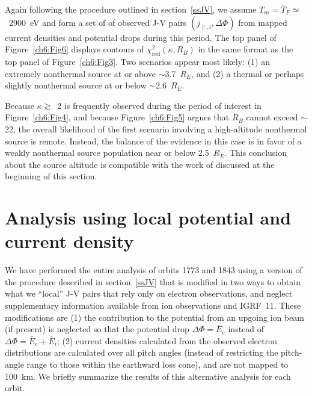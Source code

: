   
  Again following the procedure outlined in section~\ref{ssJV}, we assume
  $T_m = \bar{T}_F \simeq$~2900~eV and form a set of of observed J-V pairs
  $( j_{\parallel,i} , \Delta \Phi )$ from mapped current densities and
  potential drops during this period. The top panel of Figure~\ref{ch6:Fig6}
  displays contours of $\chi^2_{\textrm{red}} ( \kappa, R_B )$ in the same
  format as the top panel of Figure~\ref{ch6:Fig3}. Two scenarios appear most
  likely: (1) an extremely nonthermal source at or above $\sim$3.7~$R_E$, and
  (2) a thermal or perhaps slightly nonthermal source at or below
  $\sim$2.6~$R_E$.

  Because $\kappa \gtrsim$~2 is frequently observed during the period of
  interest in Figure~\ref{ch6:Fig4}, and because Figure~\ref{ch6:Fig5} argues
  that $R_B$ cannot exceed $\sim$22, the overall likelihood of the first
  scenario involving a high-altitude nonthermal source is remote. Instead, the
  balance of the evidence in this case is in favor of a weakly nonthermal source
  population near or below 2.5~$R_E$. This conclusion about the source altitude
  is compatible with the work of \citet{Ergun1998} discussed at the beginning of
  this section.
  
  \section{Analysis using local potential and current density}

  We have performed the entire analysis of orbits 1773 and 1843 using a version
  of the procedure described in section~\ref{ssJV} that is modified in two ways
  to obtain what we ``local'' J-V pairs that rely only on electron observations, and
  neglect supplementary information available from ion observations and
  IGRF~11. These modifications are (1) the contribution to the potential from an
  upgoing ion beam (if present) is neglected so that the potential drop
  $\Delta \Phi = \bar{E}_e$ instead of $\Delta \Phi = \bar{E}_e + \bar{E}_i$;
  (2) current densities calculated from the observed electron distributions are
  calculated over all pitch angles (instead of restricting the pitch-angle range
  to those within the earthward loss cone), and are not mapped to 100~km. We
  briefly summarize the results of this alternative analysis for each orbit.


